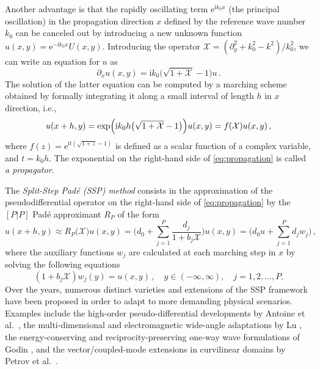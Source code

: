 \documentclass[11pt,a4paper]{article}
\newcommand{\iu}{\mathrm{i}} %
\newcommand{\cX}{\mathcal{X}}
\theoremstyle{plain}%
\theoremstyle{definition}
\theoremstyle{remark}
\begin{document}
Another advantage is that the rapidly oscillating term $\mathrm{e}^{\iu k_0 x}$ (the principal oscillation) in the propagation direction $x$ defined by the reference wave number $k_0$ can be canceled out by introducing a new unknown function
$u(x,y) = \mathrm{e}^{-\iu k_0x}U(x,y)$. 
Introducing the operator $\mathcal{X} = (\partial_y^2 + k_0^2 - k^2)/k_0^2$, we can write an equation for $u$ as
\begin{equation}
    \partial_x u(x,y) = \iu k_0 \bigl( \sqrt{1 + \cX} - 1 \bigr)u\,.
\end{equation}
The solution of the latter equation can be computed by a marching scheme obtained by formally integrating it along a small interval of length $h$ in $x$ direction, i.e.,
\begin{equation}\label{eq:propagation}
    u(x+h, y) = \exp\Bigl(\iu k_0 h \bigl(\sqrt{1 + \cX } - 1 \bigr)\Bigr) u(x, y) = f(\cX)u(x, y)\,,
\end{equation}
where $f(z) = \mathrm{e}^{\iu t (\sqrt{1+z}-1)}$ is defined as a scalar function of a complex variable, and $t = k_0h$. 
The exponential on the right-hand side of \eqref{eq:propagation} is called \textit{a propagator}.

The \textit{Split-Step Pad\'e (SSP) method} consists in the approximation of the pseudodifferential operator on the right-hand side of \eqref{eq:propagation} by the $[P|P]$ Pad\'e approximant $R_P$ of the form
\begin{equation}\label{eq:pade}
    u(x+h, y) \approx R_P\bigl(\cX\bigr) u(x,y)
    = \biggl( d_0 + \sum_{j=1}^{P} \frac{d_j}{1 + b_j \cX} \biggr) u(x,y) 
    = \biggl( d_0 u + \sum_{j=1}^P d_j w_j \biggr)\,,
\end{equation}
where the auxiliary functions $w_j$ are calculated at each marching step in $x$ by solving the following equations
\begin{equation}\label{wj}
    (1 + b_j \cX) w_j(y)=u(x,y)\,,\quad y\in  (-\infty,\infty),\quad j=1,2,\dots,P.
\end{equation}
Over the years, numerous distinct varieties and extensions of the SSP framework have been proposed in order to adapt to more demanding physical scenarios.
Examples include the high-order pseudo-differential developments by Antoine et al.\ \cite{antoine2020pseudospectral}, 
the multi-dimensional and electromagnetic wide-angle adaptations by Lu \cite{LU1999231}, 
the energy-conserving and reciprocity-preserving one-way wave formulations of Godin \cite{godin1999reciprocity},
and the vector/coupled-mode extensions in curvilinear domains by Petrov et al.\ \cite{petrov024generalization}.
\end{document}
